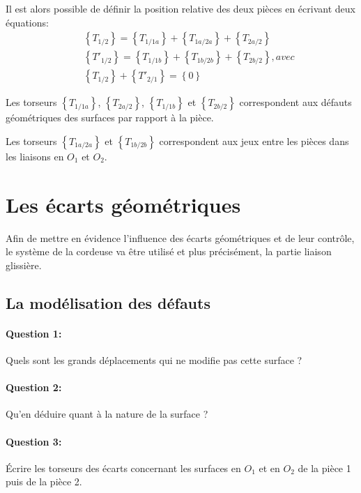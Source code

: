 Il est alors possible de définir la position relative des deux pièces en écrivant deux équations:
\begin{eqnarray}
& & \left\{T_{1/2}\right\}=\left\{T_{1/1a}\right\}+ \left\{T_{1a/2a}\right\}+\left\{T_{2a/2}\right\} \nonumber \\
& & \left\{T'_{1/2}\right\}=\left\{T_{1/1b}\right\}+ \left\{T_{1b/2b}\right\}+\left\{T_{2b/2}\right\}, avec \nonumber \\
& & \left\{T_{1/2}\right\}+\left\{T'_{2/1}\right\}=\left\{0\right\}
\end{eqnarray}

Les torseurs $\left\{T_{1/1a}\right\}$, $\left\{T_{2a/2}\right\}$, $\left\{T_{1/1b}\right\}$ et $\left\{T_{2b/2}\right\}$ correspondent aux défauts géométriques des surfaces par rapport à la pièce.

Les torseurs $\left\{T_{1a/2a}\right\}$ et $\left\{T_{1b/2b}\right\}$ correspondent aux jeux entre les pièces dans les liaisons en $O_1$ et $O_2$.

\section{Les écarts géométriques}

Afin de mettre en évidence l'influence des écarts géométriques et de leur contrôle, le système de la cordeuse va être utilisé et plus précisément, la partie liaison glissière.

\subsection{La modélisation des défauts}

\paragraph{Question 1:} Quels sont les grands déplacements qui ne modifie pas cette surface ?

\reponse[2]

\paragraph{Question 2:} Qu'en déduire quant à la nature de la surface ?

\reponse[2]

\paragraph{Question 3:} Écrire les torseurs des écarts concernant les surfaces en $O_1$ et en $O_2$ de la pièce 1 puis de la pièce 2.

